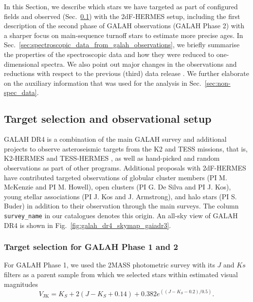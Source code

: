 \documentclass[
  journal=pasa,
  manuscript=research-paper, %
  year=2024,
  volume=37
]{cup-journal}
\begin{document}
In this Section, we describe which stars we have targeted as part of configured fields \citep{Miszalski2006} and observed (Sec.~\ref{sec:target_selection_observations}) with the 2dF-HERMES setup, including the first description of the second phase of GALAH observations (GALAH Phase 2) with a sharper focus on main-sequence turnoff stars to estimate more precise ages. In Sec.~\ref{sec:spectroscopic_data_from_galah_observations}, we briefly summarise the properties of the spectroscopic data and how they were reduced to one-dimensional spectra. We also point out major changes in the observations and reductions with respect to the previous (third) data release \citep{Buder2021}. We further elaborate on the auxiliary information that was used for the analysis in Sec.~\ref{sec:non-spec_data}.

\subsection{Target selection and observational setup} \label{sec:target_selection_observations}

GALAH DR4 is a combination of the main GALAH survey and additional projects to observe asteroseismic targets from the K2 \citep{Howell2014} and TESS \citep{Ricker2015} missions, that is, K2-HERMES \citep{Sharma2019} and TESS-HERMES \citep{Sharma2018}, as well as hand-picked and random observations as part of other programs. Additional proposals with 2dF-HERMES have contributed targeted observations of globular cluster members (PI M. McKenzie and PI M. Howell), open clusters (PI G. De Silva and PI J. Kos), young stellar associations (PI J. Kos and J. Armstrong), and halo stars (PI S. Buder) in addition to their observation through the main surveys. The column \texttt{survey\_name} in our catalogues denotes this origin. An all-sky view of GALAH DR4 is shown in Fig.~\ref{fig:galah_dr4_skymap_gaiadr3}.

\subsubsection{Target selection for GALAH Phase 1 and 2}

For GALAH Phase 1, we used the 2MASS photometric survey \citep{Skrutskie2006} with its $J$ and $Ks$ filters as a parent sample from which we selected stars within estimated visual magnitudes
\begin{equation}
V_\mathrm{JK} = K_S+2(J-K_S+0.14)+0.382e^{((J-K_S-0.2)/0.5)}.
\end{equation}
\end{document}
